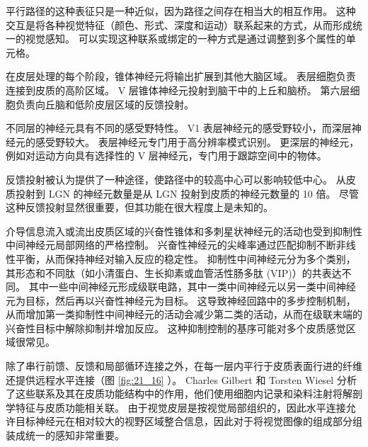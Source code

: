 平行路径的这种表征只是一种近似，因为路径之间存在相当大的相互作用。 
这种交互是将各种视觉特征（颜色、形式、深度和运动）联系起来的方式，从而形成统一的视觉感知。 
可以实现这种联系或绑定的一种方式是通过调整到多个属性的单元格。


在皮层处理的每个阶段，锥体神经元将输出扩展到其他大脑区域。 
表层细胞负责连接到皮质的高阶区域。 
V 层锥体神经元投射到脑干中的上丘和脑桥。 
第六层细胞负责向丘脑和低阶皮层区域的反馈投射。


不同层的神经元具有不同的感受野特性。 
V1 表层神经元的感受野较小，而深层神经元的感受野较大。 
表层神经元专门用于高分辨率模式识别。 
更深层的神经元，例如对运动方向具有选择性的 V 层神经元，专门用于跟踪空间中的物体。


反馈投射被认为提供了一种途径，使路径中的较高中心可以影响较低中心。 
从皮质投射到 LGN 的神经元数量是从 LGN 投射到皮质的神经元数量的 10 倍。 
尽管这种反馈投射显然很重要，但其功能在很大程度上是未知的。


介导信息流入或流出皮质区域的兴奋性锥体和多刺星状神经元的活动也受到抑制性中间神经元局部网络的严格控制。 
兴奋性神经元的尖峰率通过匹配抑制不断非线性平衡，从而保持神经对输入反应的稳定性。 
抑制性中间神经元分为多个类别，其形态和不同肽（如小清蛋白、生长抑素或血管活性肠多肽 (VIP)）的共表达不同。 
其中一些中间神经元形成级联电路，其中一类中间神经元以另一类中间神经元为目标，然后再以兴奋性神经元为目标。 
这导致神经回路中的多步控制机制，从而增加第一类抑制性中间神经元的活动会减少第二类的活动，从而在级联末端的兴奋性目标中解除抑制并增加反应。 
这种抑制控制的基序可能对多个皮质感觉区域很常见。


除了串行前馈、反馈和局部循环连接之外，在每一层内平行于皮质表面行进的纤维还提供远程水平连接（图 \ref{fig:21_16} ）。 
Charles Gilbert 和 Torsten Wiesel 分析了这些联系及其在皮质功能结构中的作用，他们使用细胞内记录和染料注射将解剖学特征与皮质功能相关联。 
由于视觉皮层是按视觉局部组织的，因此水平连接允许目标神经元在相对较大的视野区域整合信息，因此对于将视觉图像的组成部分组装成统一的感知非常重要。

